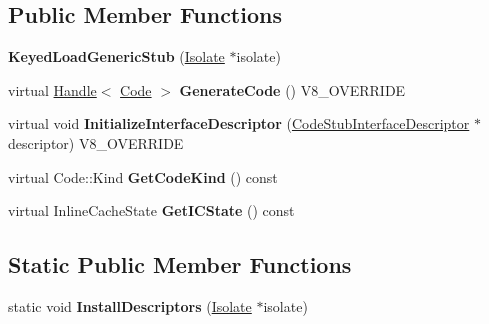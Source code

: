 \subsection*{Public Member Functions}
\begin{DoxyCompactItemize}
\item 
\hypertarget{classv8_1_1internal_1_1_keyed_load_generic_stub_a1d0c6020e09c4fd470e0339ab42ce2bb}{}{\bfseries Keyed\+Load\+Generic\+Stub} (\hyperlink{classv8_1_1internal_1_1_isolate}{Isolate} $\ast$isolate)\label{classv8_1_1internal_1_1_keyed_load_generic_stub_a1d0c6020e09c4fd470e0339ab42ce2bb}

\item 
\hypertarget{classv8_1_1internal_1_1_keyed_load_generic_stub_ada358e69600b76550d63b695df76b3f7}{}virtual \hyperlink{classv8_1_1internal_1_1_handle}{Handle}$<$ \hyperlink{classv8_1_1internal_1_1_code}{Code} $>$ {\bfseries Generate\+Code} () V8\+\_\+\+O\+V\+E\+R\+R\+I\+D\+E\label{classv8_1_1internal_1_1_keyed_load_generic_stub_ada358e69600b76550d63b695df76b3f7}

\item 
\hypertarget{classv8_1_1internal_1_1_keyed_load_generic_stub_aeb16e798c2a08ae587f53f86708d20d2}{}virtual void {\bfseries Initialize\+Interface\+Descriptor} (\hyperlink{classv8_1_1internal_1_1_code_stub_interface_descriptor}{Code\+Stub\+Interface\+Descriptor} $\ast$descriptor) V8\+\_\+\+O\+V\+E\+R\+R\+I\+D\+E\label{classv8_1_1internal_1_1_keyed_load_generic_stub_aeb16e798c2a08ae587f53f86708d20d2}

\item 
\hypertarget{classv8_1_1internal_1_1_keyed_load_generic_stub_ae4832f56b41187da75321c70f73d3e08}{}virtual Code\+::\+Kind {\bfseries Get\+Code\+Kind} () const \label{classv8_1_1internal_1_1_keyed_load_generic_stub_ae4832f56b41187da75321c70f73d3e08}

\item 
\hypertarget{classv8_1_1internal_1_1_keyed_load_generic_stub_ac9dbe3c3f27fba41e66dc5f9beb94aaf}{}virtual Inline\+Cache\+State {\bfseries Get\+I\+C\+State} () const \label{classv8_1_1internal_1_1_keyed_load_generic_stub_ac9dbe3c3f27fba41e66dc5f9beb94aaf}

\end{DoxyCompactItemize}
\subsection*{Static Public Member Functions}
\begin{DoxyCompactItemize}
\item 
\hypertarget{classv8_1_1internal_1_1_keyed_load_generic_stub_aa9dffaf18b5a6d92fe154acf9228556e}{}static void {\bfseries Install\+Descriptors} (\hyperlink{classv8_1_1internal_1_1_isolate}{Isolate} $\ast$isolate)\label{classv8_1_1internal_1_1_keyed_load_generic_stub_aa9dffaf18b5a6d92fe154acf9228556e}

\end{DoxyCompactItemize}
